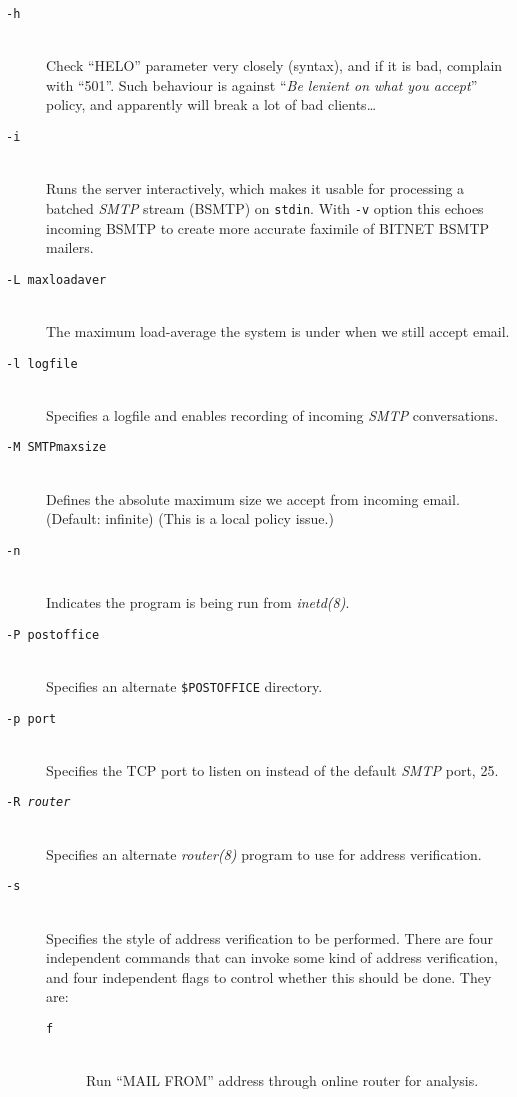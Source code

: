 \begin{description}
\item[\tt -h] \mbox{} \\
Check ``HELO'' parameter very closely (syntax), and if it is bad,
complain with ``501''.
Such behaviour is against ``{\em Be lenient on what you accept}'' policy,
and apparently will break a lot of bad clients\ldots

\item[\tt -i] \mbox{} \\
Runs the server interactively, which makes it usable for processing a batched 
{\em SMTP} stream (BSMTP) on {\tt stdin}. With {\tt -v} option this echoes incoming BSMTP to create more 
accurate faximile of BITNET BSMTP mailers.

\item[\tt -L maxloadaver] \mbox{} \\
The maximum load-average the system is under when we still accept email.

\item[\tt -l logfile] \mbox{} \\
Specifies a logfile and enables recording of incoming {\em SMTP} conversations.

\item[\tt -M SMTPmaxsize] \mbox{} \\
Defines the absolute maximum size we accept from incoming email. 
(Default: infinite) (This is a local policy issue.)

\item[\tt -n] \mbox{} \\
Indicates the program is being run from {\em inetd(8)}.

\item[\tt -P postoffice] \mbox{} \\
Specifies an alternate {\tt \$POSTOFFICE} directory.

\item[\tt -p port] \mbox{} \\
Specifies the TCP port to listen on instead of the default {\em SMTP} port, 25.

\item[\tt -R {\em router}] \mbox{} \\
Specifies an alternate {\em router(8)} program to use for address verification.

\item[\tt -s] \mbox{} \\
Specifies the style of address verification to be performed. There are four independent commands 
that can invoke some kind of address verification, and four independent flags to control whether this should be done. 
They are:
\begin{description}
\item[\tt f]\mbox{}\\
Run ``MAIL FROM'' address through online router for analysis.


\end{description}
\end{description}
